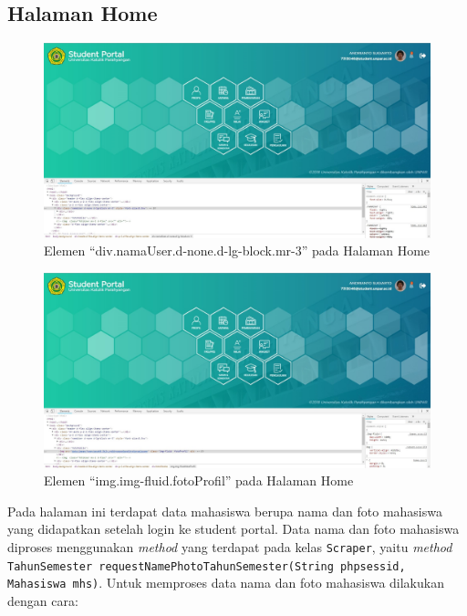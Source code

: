 \subsection{Halaman Home}
		\begin{figure}[H]
			\centering
			\includegraphics[scale=0.3]{Gambar/Home_nama_user}
			\caption{Elemen ``div.namaUser.d-none.d-lg-block.mr-3'' pada Halaman Home}
			\label{pic:home_nama_user}
		\end{figure}
		\begin{figure}[H]
			\centering
			\includegraphics[scale=0.3]{Gambar/Home_foto_user}
			\caption{Elemen ``img.img-fluid.fotoProfil'' pada Halaman Home}
			\label{pic:home_foto_user}
		\end{figure}
Pada halaman ini terdapat data mahasiswa berupa nama dan foto mahasiswa yang didapatkan setelah login ke student portal. Data nama dan foto mahasiswa diproses menggunakan \textit{method} yang terdapat pada kelas \texttt{Scraper}, yaitu  \textit{method} \texttt{TahunSemester requestNamePhotoTahunSemester(String phpsessid, Mahasiswa mhs)}. Untuk memproses data nama dan foto mahasiswa dilakukan dengan cara:
